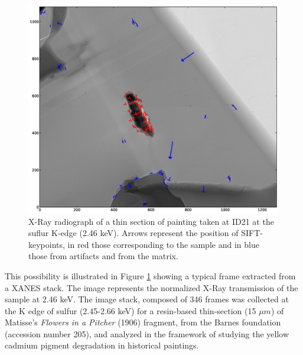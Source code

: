 \documentclass[preprint]{iucr}
\begin{document}
\begin{figure}
\label{fig:sample}
\begin{center}
\includegraphics[width=15cm]{features.eps}
\caption{ X-Ray radiograph of a thin section of painting
taken at ID21 at the suflur K-edge (2.46 keV). Arrows represent the position of
SIFT-keypoints, in red those corresponding to the sample and in blue those from artifacts and from
the matrix.}
\end{center}
\end{figure}

This possibility is illustrated in Figure \ref{fig:sample} showing a typical
frame extracted from a XANES stack.
The image represents the normalized X-Ray transmission of the sample at 2.46
keV.
The image stack, composed of 346 frames was collected at the K edge of sulfur
(2.45-2.66 keV) for a resin-based thin-section
(15 $\mu m$) of Matisse’s \emph{Flowers in a Pitcher} (1906) fragment, from the
Barnes foundation (accession number 205), and analyzed in the framework of
studying the yellow cadmium pigment degradation in historical paintings.
\end{document}
